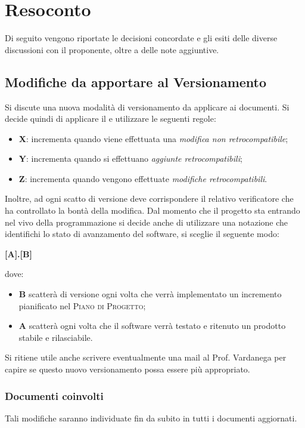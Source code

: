 \documentclass{article}
\begin{document}
\newpage
\section{Resoconto}
\label{sec:resoconto}

Di seguito vengono riportate le decisioni concordate e gli esiti delle diverse discussioni con il proponente, oltre a
delle note aggiuntive.

\subsection{Modifiche da apportare al Versionamento}
\label{itm:1}

Si discute una nuova modalità di versionamento da applicare ai documenti. Si decide quindi di applicare il  e utilizzare le seguenti regole:
\begin{itemize}
    \item \textbf{X}: incrementa quando viene effettuata una \emph{modifica non retrocompatibile};
	\item \textbf{Y}: incrementa quando si effettuano \emph{aggiunte  retrocompatibili};
	\item \textbf{Z}: incrementa quando vengono effettuate \emph{modifiche retrocompatibili}.
\end{itemize}
Inoltre, ad ogni scatto di versione deve corrispondere il relativo verificatore che ha controllato la bontà della modifica.
Dal momento che il progetto sta entrando nel vivo della programmazione si decide anche di utilizzare una notazione che identifichi lo stato di avanzamento del software, si sceglie il seguente modo:
\begin{center}
    \textbf{[A].[B]}
\end{center}
dove:
\begin{itemize}
\item \textbf{B} scatterà di versione ogni volta che verrà implementato un incremento pianificato nel \textsc{Piano di Progetto};
\item \textbf{A} scatterà ogni volta che il software verrà testato e ritenuto un prodotto stabile e rilasciabile.
\end{itemize}
Si ritiene utile anche scrivere eventualmente una mail al Prof. Vardanega per capire se questo nuovo versionamento possa essere più appropriato.
\subsubsection*{Documenti coinvolti}
Tali modifiche saranno individuate fin da subito in tutti i documenti aggiornati.
\end{document}
